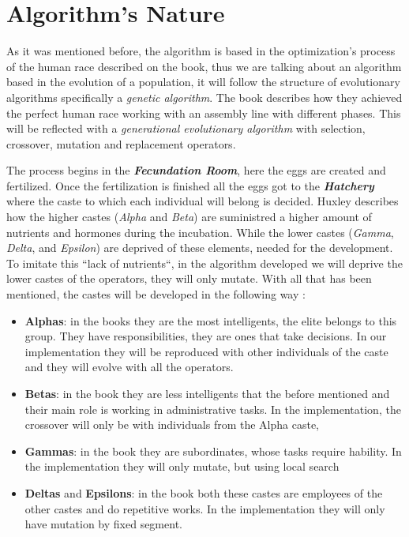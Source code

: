 \section{Algorithm's Nature}

As it was mentioned before, the algorithm is based in the optimization's process of the human race described on the book, thus we
are talking about an algorithm based in the evolution of a population, it will follow the structure of evolutionary algorithms
specifically a \textit{genetic algorithm}. The book describes how they achieved the perfect human race working with an assembly 
line with different phases. This will be reflected with a \textit{generational evolutionary algorithm} with selection, 
crossover, mutation and replacement operators.

The process begins in the \textbf{\textit{Fecundation Room}}, here the eggs are created and fertilized. Once the fertilization
is finished all the eggs got to the \textbf{\textit{Hatchery}} where the caste to which each individual will belong is decided. 
Huxley describes how the higher castes (\textit{Alpha} and \textit{Beta}) are suministred a higher amount of nutrients and hormones during the 
incubation. While the lower castes (\textit{Gamma}, \textit{Delta}, and \textit{Epsilon}) are deprived of these elements, needed for the development.
To imitate this ``lack of nutrients``, in the algorithm developed we will deprive the lower castes of the operators, they will only mutate. 
With all that has been mentioned, the castes will be developed in the following way :

\begin{itemize}
    \item \textbf{Alphas}: in the books they are the most intelligents, the elite belongs to this group. They have responsibilities, they are
    ones that take decisions. In our implementation they will be reproduced with other individuals of the caste and they will evolve with
    all the operators.
    \item \textbf{Betas}: in the book they are less intelligents that the before mentioned and their main role is working in administrative tasks.
    In the implementation, the crossover will only be with individuals from the Alpha caste,
    \item \textbf{Gammas}: in the book they are subordinates, whose tasks require hability. In the implementation they will only mutate, but using local
    search
    \item \textbf{Deltas} and \textbf{Epsilons}: in the book both these castes are employees of the other castes and do repetitive works. In the 
    implementation they will only have mutation by fixed segment. 
\end{itemize}

